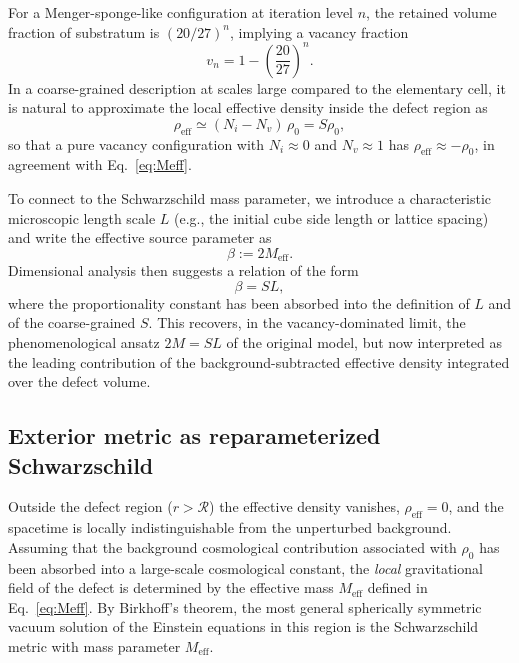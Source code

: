 \documentclass[%
  reprint,
  superscriptaddress,
  showpacs,
  showkeys,
  amsmath,amssymb,
  pra,
  longbibliography,
  floatfix,
  x11names
]{revtex4-2}
\begin{document}
For a Menger-sponge-like configuration at iteration level $n$, the retained volume fraction of substratum is $(20/27)^n$, implying a vacancy fraction
\begin{equation}
v_n = 1 - \left(\frac{20}{27}\right)^n.
\end{equation}
In a coarse-grained description at scales large compared to the elementary cell, it is natural to approximate the local effective density inside the defect region as
\begin{equation}
\rho_{\text{eff}} \simeq (N_i - N_v)\,\rho_0 = S \rho_0,
\end{equation}
so that a pure vacancy configuration with $N_i \approx 0$ and $N_v\approx 1$ has $\rho_{\text{eff}} \approx -\rho_0$, in agreement with Eq.~\eqref{eq:Meff}.

To connect to the Schwarzschild mass parameter, we introduce a characteristic microscopic length scale $L$ (e.g., the initial cube side length or lattice spacing) and write the effective source parameter as
\begin{equation}
\beta := 2 M_{\text{eff}}.
\end{equation}
Dimensional analysis then suggests a relation of the form
\begin{equation}
\beta = S L,
\label{eq:beta_SL}
\end{equation}
where the proportionality constant has been absorbed into the definition of $L$ and of the coarse-grained $S$. This recovers, in the vacancy-dominated limit, the phenomenological ansatz $2M = SL$ of the original model, but now interpreted as the leading contribution of the background-subtracted effective density integrated over the defect volume.

\subsection{Exterior metric as reparameterized Schwarzschild}
\label{2025-menger-gmld}

Outside the defect region ($r>\mathcal{R}$) the effective density vanishes, $\rho_{\text{eff}}=0$, and the spacetime is locally indistinguishable from the unperturbed background. Assuming that the background cosmological contribution associated with $\rho_0$ has been absorbed into a large-scale cosmological constant, the \emph{local} gravitational field of the defect is determined by the effective mass $M_{\text{eff}}$ defined in Eq.~\eqref{eq:Meff}. By Birkhoff's theorem, the most general spherically symmetric vacuum solution of the Einstein equations in this region is the Schwarzschild metric with mass parameter $M_{\text{eff}}$.
\end{document}
